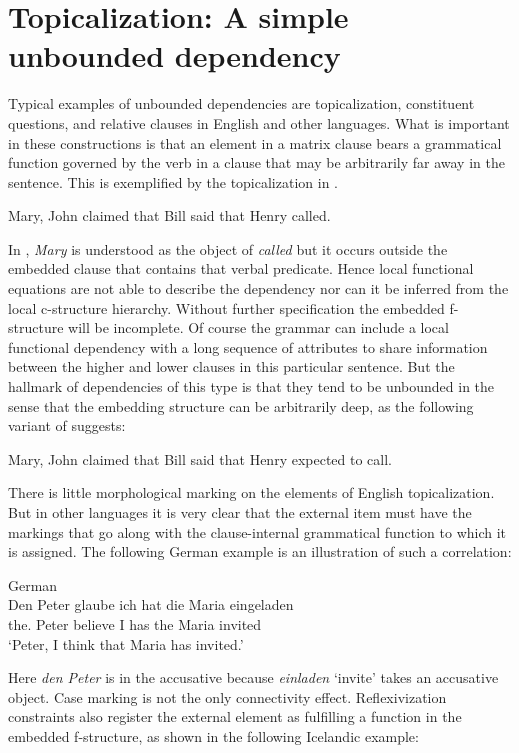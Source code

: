 \documentclass[output=paper,hidelinks]{langscibook}
\begin{document}
\section{Topicalization:  A simple unbounded dependency}\label{topicalization}

Typical examples of {unbounded dependencies} are topicalization, constituent questions, and relative clauses in English and other languages. What is important in these constructions is that an element in a matrix clause bears a grammatical function governed by the verb in a clause that may be arbitrarily far away in the sentence. This is exemplified by the topicalization in .

\ea \label{topic}
Mary, John claimed that Bill said that Henry called.
\z

\noindent In , \textit{Mary} is understood as the object of \textit{called} but it occurs outside the embedded clause that contains that verbal predicate. Hence local functional equations are not able to describe the dependency nor can it be inferred from the local c-structure hierarchy.   Without further specification the embedded f-structure will be incomplete.  Of course the grammar can include a local functional dependency with a long sequence of attributes to share information between the higher and lower clauses in this particular sentence. But the hallmark of dependencies of this type is that they tend to be unbounded in the sense that the embedding structure can be arbitrarily deep, as the following variant of  suggests:

\ea\label{topic2}
Mary, John claimed that Bill said that Henry expected to call.\\ 
\z

There is little morphological marking on the elements of English topicalization. But in other languages it is very clear that the external item must have the markings that go along with the clause-internal grammatical function to which it is assigned. The following German example is an illustration of such a correlation:

\ea \label{comp3}German \citep{Berman2003}\\
\gll Den Peter glaube ich hat die Maria eingeladen\\  
     the.{\ACC} Peter believe I has the Maria invited \\
\glt `Peter, I think that Maria has invited.'\\
\z

\noindent Here \textit{den Peter} is in the accusative because \textit{einladen} `invite' takes an accusative object. Case marking is not the only connectivity effect. Reflexivization constraints also register the external element as fulfilling a function in the embedded f-structure, as shown in the following Icelandic example:
\end{document}
